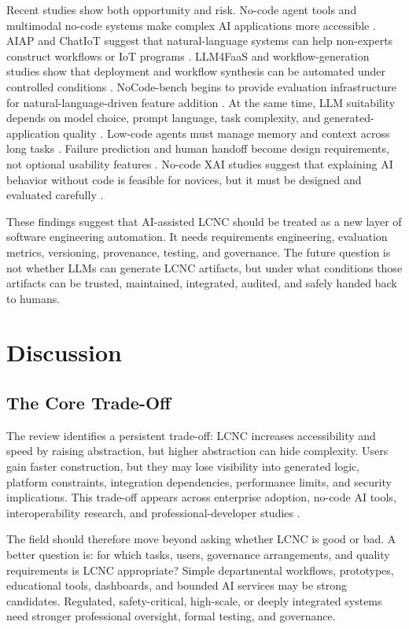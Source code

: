 \documentclass[conference]{IEEEtran}
\begin{document}
Recent studies show both opportunity and risk. No-code agent tools and multimodal no-code systems make complex AI applications more accessible \cite{p32,p40}. AIAP and ChatIoT suggest that natural-language systems can help non-experts construct workflows or IoT programs \cite{p31,p35}. LLM4FaaS and workflow-generation studies show that deployment and workflow synthesis can be automated under controlled conditions \cite{p04,p07}. NoCode-bench begins to provide evaluation infrastructure for natural-language-driven feature addition \cite{p08}. At the same time, LLM suitability depends on model choice, prompt language, task complexity, and generated-application quality \cite{p05}. Low-code agents must manage memory and context across long tasks \cite{p41}. Failure prediction and human handoff become design requirements, not optional usability features \cite{p42}. No-code XAI studies suggest that explaining AI behavior without code is feasible for novices, but it must be designed and evaluated carefully \cite{p50}.

These findings suggest that AI-assisted LCNC should be treated as a new layer of software engineering automation. It needs requirements engineering, evaluation metrics, versioning, provenance, testing, and governance. The future question is not whether LLMs can generate LCNC artifacts, but under what conditions those artifacts can be trusted, maintained, integrated, audited, and safely handed back to humans.

\section{Discussion}
\subsection{The Core Trade-Off}
The review identifies a persistent trade-off: LCNC increases accessibility and speed by raising abstraction, but higher abstraction can hide complexity. Users gain faster construction, but they may lose visibility into generated logic, platform constraints, integration dependencies, performance limits, and security implications. This trade-off appears across enterprise adoption, no-code AI tools, interoperability research, and professional-developer studies \cite{p12,p18,p34,p39,p49}.

The field should therefore move beyond asking whether LCNC is good or bad. A better question is: for which tasks, users, governance arrangements, and quality requirements is LCNC appropriate? Simple departmental workflows, prototypes, educational tools, dashboards, and bounded AI services may be strong candidates. Regulated, safety-critical, high-scale, or deeply integrated systems need stronger professional oversight, formal testing, and governance.
\end{document}
